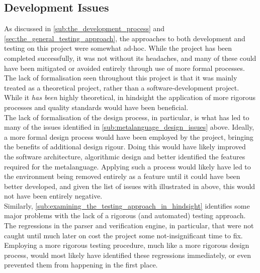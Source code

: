 

\subsection{Development Issues} %
\label{sub:development_issues}
As discussed in \autoref{sub:the_development_process} and \autoref{sec:the_general_testing_approach}, the approaches to both development and testing on this project were somewhat ad-hoc. 
While the project has been completed successfully, it was not without its headaches, and many of these could have been mitigated or avoided entirely through use of more formal processes.
The lack of formalisation seen throughout this project is that it was mainly treated as a theoretical project, rather than a software-development project.
While it \textit{has been} highly theoretical, in hindsight the application of more rigorous processes and quality standards would have been beneficial.\\

The lack of formalisation of the design process, in particular, is what has led to many of the issues identified in \autoref{sub:metalanguage_design_issues} above.
Ideally, a more formal design process would have been employed by the project, bringing the benefits of additional design rigour.
Doing this would have likely improved the software architecture, algorithmic design and better identified the features required for the metalanguage. 
Applying such a process would likely have led to the environment being removed entirely as a feature until it could have been better developed, and given the list of issues with illustrated in  above, this would not have been entirely negative. \\

Similarly, \autoref{sub:examining_the_testing_approach_in_hindsight} identifies some major problems with the lack of a rigorous (and automated) testing approach.
The regressions in the parser and verification engine, in particular, that were not caught until much later on cost the project some not-insignificant time to fix.
Employing a more rigorous testing procedure, much like a more rigorous design process, would most likely have identified these regressions immediately, or even prevented them from happening in the first place.\\

